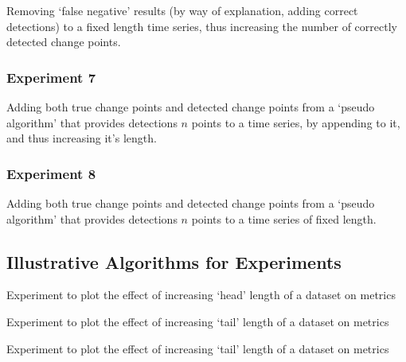 \documentclass{uvamscse}	%
\begin{document}
Removing `false negative' results (by way of explanation, adding correct detections) to a fixed length time series, thus increasing the number of correctly detected change points.



\subsubsection{Experiment 7}

Adding both true change points and detected change points from a `pseudo algorithm' that provides detections $n$ points  to a time series, by appending to it, and thus increasing it's length.

\subsubsection{Experiment 8}

Adding both true change points and detected change points from a `pseudo algorithm' that provides detections $n$ points  to a time series of fixed length.

\subsection{Illustrative Algorithms for Experiments}

\begin{algorithm}
\caption{Experiment to plot the effect of increasing `head' length of a dataset on metrics}
\end{algorithm}


\begin{algorithm}
\caption{Experiment to plot the effect of increasing `tail' length of a dataset on metrics}
\end{algorithm}

\begin{algorithm}
\caption{Experiment to plot the effect of increasing `tail' length of a dataset on metrics}
\end{algorithm}
\end{document}
